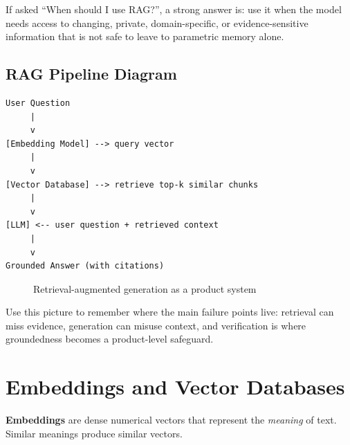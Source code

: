 \documentclass[12pt, a4paper, oneside]{book}
\begin{document}
\begin{examtipbox}
If asked ``When should I use RAG?'', a strong answer is: use it when the model needs access to changing, private, domain-specific, or evidence-sensitive information that is not safe to leave to parametric memory alone.
\end{examtipbox}

\subsection{RAG Pipeline Diagram}

\begin{verbatim}
User Question
     |
     v
[Embedding Model] --> query vector
     |
     v
[Vector Database] --> retrieve top-k similar chunks
     |
     v
[LLM] <-- user question + retrieved context
     |
     v
Grounded Answer (with citations)
\end{verbatim}

\begin{figure}[H]
\centering
{}
\caption{Retrieval-augmented generation as a product system}
\label{fig:rag-system}
\end{figure}

Use this picture to remember where the main failure points live: retrieval can miss evidence, generation can misuse context, and verification is where groundedness becomes a product-level safeguard.

\section{Embeddings and Vector Databases}

\textbf{Embeddings} are dense numerical vectors that represent the \emph{meaning} of text. Similar meanings produce similar vectors.
\end{document}
